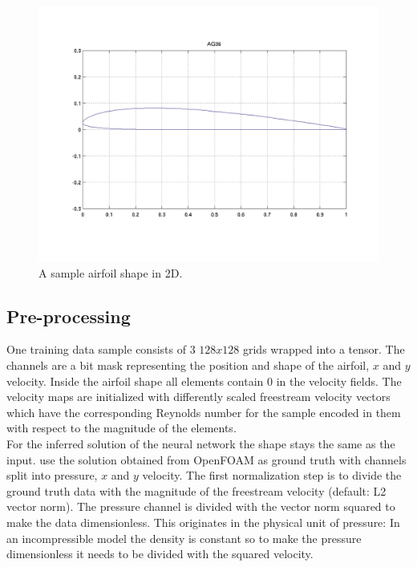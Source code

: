 \documentclass[acmtog]{techreportacmart}
\begin{document}
\begin{figure}[H]
  \includegraphics[width=.4\textwidth]{figures/uiuc_sample}
  \vspace*{-10mm}
  \caption{A sample airfoil shape in 2D.}
  \label{fig:one}
\end{figure}

\subsection{Pre-processing}
One training data sample consists of $3$ $128x128$ grids wrapped into a tensor. The channels are a bit 
mask representing the position and shape of the airfoil, $x$ and $y$ velocity. Inside the airfoil shape 
all elements contain $0$ in the velocity fields. The velocity maps are initialized with differently 
scaled freestream velocity vectors which have the corresponding Reynolds number for the sample encoded 
in them with respect to the magnitude of the elements. \\For the inferred solution of the neural network 
the shape stays the same as the input. \cite{Thuerey20} use the solution obtained from OpenFOAM as ground 
truth with channels split into pressure, $x$ and $y$ velocity. The first normalization step is to divide 
the  ground truth data with the magnitude of the freestream velocity (default: L2 vector norm). The 
pressure channel is divided with the vector norm squared to make the data dimensionless. This originates 
in the physical unit of pressure: In an incompressible model the density is constant so to make the 
pressure dimensionless it needs to be divided with the squared velocity. \\
\end{document}

